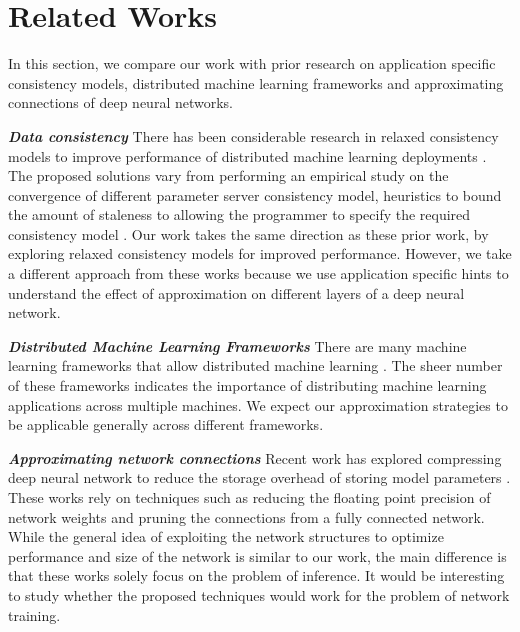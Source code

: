 \section{Related Works}

In this section, we compare our work with prior research
on application specific consistency models, distributed
machine learning frameworks and approximating connections 
of deep neural networks.

\emph{\textbf{Data consistency}} There has been considerable
research in relaxed consistency models to improve performance
of distributed machine learning deployments \cite{ganger}\cite{stalesynchronousps}\cite{garth}\cite{parameterserver}.
The proposed solutions vary from performing an empirical study on the 
convergence of different parameter server consistency model\cite{garth}, 
heuristics to bound the amount of staleness \cite{ganger} to 
allowing the programmer to specify the required consistency model \cite{parameterserver}.
Our work takes the same direction as these prior work, by exploring
relaxed consistency models for improved performance. However, we take
a different approach from these works because we use application specific
hints to understand the effect of approximation on different layers of a 
deep neural network.

\emph{\textbf{Distributed Machine Learning Frameworks}} There are many
machine learning frameworks that allow distributed machine learning \cite{tensorflow}
\cite{parameterserver}\cite{distbelief}\cite{petuum}\cite{mxnet}. The sheer number
of these frameworks indicates the importance of distributing machine learning
applications across multiple machines. We expect our approximation strategies
to be applicable generally across different frameworks.

\emph{\textbf{Approximating network connections}} Recent work has explored 
compressing deep neural network to reduce the storage overhead of storing 
model parameters \cite{compresseddnn}\cite{eie}. These works rely on techniques
such as reducing the floating point precision of network weights and pruning
the connections from a fully connected network. While the general idea of 
exploiting the network structures to optimize performance and size of the network
is similar to our work, the main difference is that these works solely focus on 
the problem of inference. It would be interesting to study whether the proposed
techniques would work for the problem of network training.

 




